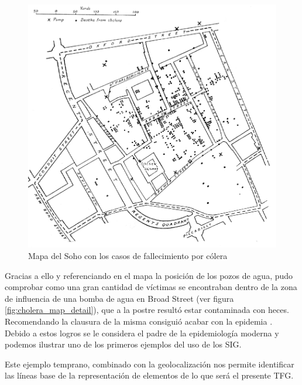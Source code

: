 \begin{figure}[h!btp]
\centering
\includegraphics[scale=0.5, fbox={\fboxrule} 4mm]{images/03-antecedentes/01-cholera_map.jpg}
\caption{Mapa del Soho con los casos de fallecimiento por cólera}
\label{fig:cholera_map}
\end{figure}

Gracias a ello y referenciando en el mapa la posición de los pozos de agua, pudo comprobar como una gran cantidad de víctimas se encontraban dentro de la zona de influencia de una bomba de agua en Broad Street (ver figura \ref{fig:cholera_map_detail}), que a la postre resultó estar contaminada con heces. Recomendando la clausura de la misma consiguió acabar con la epidemia      \cite{Gunn07}. Debido a estos logros se le considera el padre de la epidemiología moderna y podemos ilustrar uno de los primeros ejemplos del uso de los \ac{SIG}.

Este ejemplo temprano, combinado con la geolocalización nos permite identificar las líneas base de la representación de elementos de lo que será el presente \ac{TFG}.

